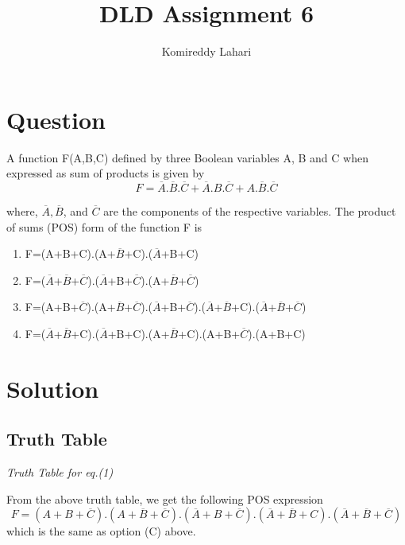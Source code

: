 \documentclass{article}
\title{DLD Assignment 6}
\author{Komireddy Lahari}
\begin{document}
\maketitle

\section{Question}
A function F(A,B,C) defined by three Boolean variables A, B and C when expressed as sum of products is given by
\begin{equation}
    F=\overline{A}.\overline{B}.\overline{C}+\overline{A}.B.\overline{C}+A.\overline{B}.\overline{C}
\end{equation}

where, $\overline{A},\overline{B}$, and $\overline{C}$ are the components of the respective variables. The product of sums (POS) form of the function F is

\begin{enumerate}[label=(\Alph*)]
    \item F=(A+B+C).(A+$\overline{B}$+C).($\overline{A}$+B+C)
    \item F=($\overline{A}$+$\overline{B}$+$\overline{C}$).($\overline{A}$+B+$\overline{C}$).(A+$\overline{B}$+$\overline{C}$)
    \item F=(A+B+$\overline{C}$).(A+$\overline{B}$+$\overline{C}$).($\overline{A}$+B+$\overline{C}$).($\overline{A}$+$\overline{B}$+C).($\overline{A}$+$\overline{B}$+$\overline{C}$)
    \item F=($\overline{A}$+$\overline{B}$+C).($\overline{A}$+B+C).(A+$\overline{B}$+C).(A+B+$\overline{C}$).(A+B+C)
\end{enumerate}

\section{Solution}

\subsection{Truth Table}
\begin{table}[h]
    \centering
    
    \caption{\textit{Truth Table for eq.(1)}}
    \label{tab:my-table}
\end{table}

From the above truth table, we get the following POS expression
\begin{equation}
    F=(A+B+\overline{C}).(A+\overline{B}+\overline{C}).(\overline{A}+B+\overline{C}).(\overline{A}+\overline{B}+C).(\overline{A}+\overline{B}+\overline{C})
\end{equation}
which is the same as option (C) above.
\end{document}
